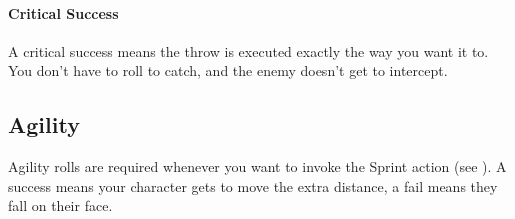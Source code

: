 \paragraph{Critical Success} A critical success means the throw is executed exactly the way you want it to.
You don't have to roll to catch, and the enemy doesn't get to intercept.

\subsection{Agility}
Agility rolls are required whenever you want to invoke the Sprint action (see ).
A success means your character gets to move the extra distance, a fail means they fall on their face.